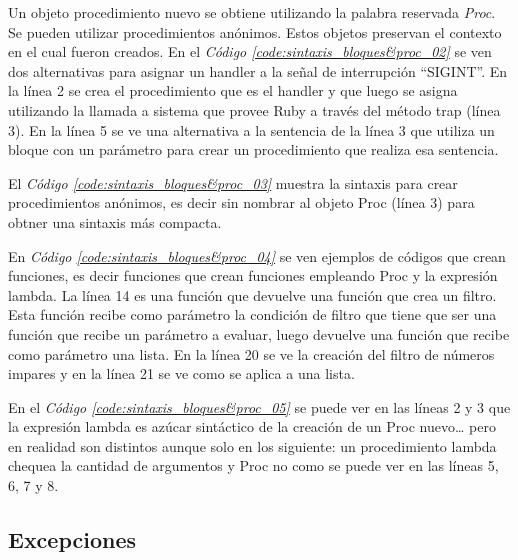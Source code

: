 \documentclass{article}
\newcommand{\refcode}[1]{\textit{Código \ref{#1}}}
\begin{document}
Un objeto procedimiento nuevo se obtiene utilizando la palabra reservada \textit{Proc}. Se pueden utilizar procedimientos anónimos. Estos objetos preservan el contexto en el cual fueron creados.
En el \refcode{code:sintaxis_bloques&proc_02} se ven dos alternativas para asignar un handler a la señal de interrupción “SIGINT”. En la línea 2 se crea el procedimiento que es el handler y que luego se asigna utilizando la llamada a sistema que provee Ruby a través del método trap (línea 3). En la línea 5 se ve una alternativa a la sentencia de la línea 3 que utiliza un bloque con un parámetro para crear un procedimiento que realiza esa sentencia. 
 

El \refcode{code:sintaxis_bloques&proc_03} muestra la sintaxis para crear procedimientos anónimos, es decir sin nombrar al objeto Proc (línea 3) para obtner una sintaxis más compacta.
 

En \refcode{code:sintaxis_bloques&proc_04} se ven ejemplos de códigos que crean funciones, es decir funciones que crean funciones empleando Proc y la expresión lambda. La línea 14 es una función que devuelve una función que crea un filtro. Esta función recibe como parámetro la condición de filtro que tiene que ser una función que recibe un parámetro a evaluar, luego devuelve una función que recibe como parámetro una lista. En la línea 20 se ve la creación del filtro de números impares y en la línea 21 se ve como se aplica a una lista.
 
En el \refcode{code:sintaxis_bloques&proc_05} se puede ver en las líneas 2 y 3 que la expresión lambda es azúcar sintáctico de la creación de un Proc nuevo… pero en realidad son distintos aunque solo en los siguiente: un procedimiento lambda chequea la cantidad de argumentos y Proc no como se puede ver en las líneas 5, 6, 7 y 8.
 
\bigskip



\subsection{Excepciones}
\end{document}
